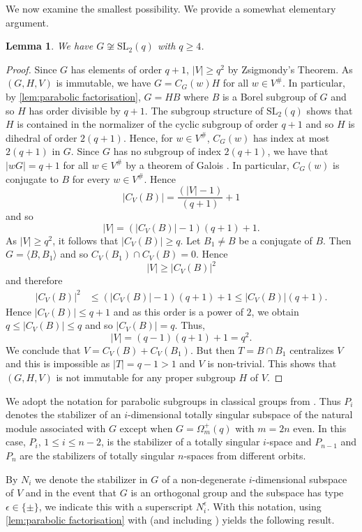 \documentclass[12pt]{amsart}
\newtheorem{lemma}[theorem]{Lemma}
\theoremstyle{remark}
\theoremstyle{notation}
\theoremstyle{definition}
\newcommand{\SL}{\mathrm{SL}}
\newcommand{\0}{\emptyset}
\begin{document}
We now examine the smallest possibility. We provide a somewhat elementary argument.

\begin{lemma}\label{lem:no factSL2}
We have  $G \not\cong \SL_2(q)$ with $q\ge 4$. \end{lemma}

\begin{proof}  Since $G$ has elements of order $q+1$, $|V| \ge q^2$ by Zsigmondy's Theorem.
 As $(G,H,V)$ is immutable, we have $G= C_G(w)H$ for all $w \in V^\#$.  In particular, by \cref{lem:parabolic factorisation}, $G=HB$ where $B$ is a Borel subgroup of $G$ and so $H$  has order divisible by $q+1$. The subgroup structure \cite[Satz II.8.27]{Huppert} of $\SL_2(q)$ shows that $H$ is contained in the normalizer of the cyclic subgroup of order $q+1$ and so $H$ is  dihedral of order $2(q+1)$. Hence, for $w\in V^\#$, $C_G(w)$ has index  at most $2(q+1)$ in $G$.    Since $G$ has no subgroup of index $2(q+1)$, we have that $|w G|=q+1$ for all $w \in V^\#$ by a theorem of Galois \cite[Satz II.8.28]{Huppert}. In particular,   $C_G(w)$ is conjugate to $B$ for every $w \in V^\#$. Hence $$|C_V(B)|= \frac{(|V|-1)}{(q+1)} +1$$ and so $$|V|= (|C_V(B)|-1)(q+1)+1.$$ As $|V|\ge q^2$, it follows that $|C_V(B)|\ge q$.
Let $B_1\ne B$ be a conjugate of $B$.
Then $G=\langle B,B_1\rangle $ and so
$C_V(B_1) \cap C_V(B)=0$. Hence $$|V|\ge |C_V(B)|^2$$
and therefore \begin{eqnarray*}
|C_V(B)|^2&\le (|C_V(B)|-1)(q+1)+1\le |C_V(B)|(q+1).
\end{eqnarray*}
Hence $|C_V(B)|\le q+1$ and as this order is a power of $2$,  we obtain $q\le |C_V(B)|\le q$ and so $|C_V(B)|=q$.  Thus, $$|V| = (q-1)(q+1)+1=q^2.$$    We conclude that $V= C_V(B)+C_V(B_1)$.  But then $T=B\cap B_1$ centralizes $V$ and this is impossible as $|T|=q-1>1$ and $V$ is non-trivial. This shows that $(G,H,V)$ is not immutable for any proper subgroup $H$ of $V$.
\end{proof}


We adopt the  notation for parabolic subgroups  in classical groups from \cite[Page 5]{LiebeckPraegerSaxl}. Thus $P_i$ denotes the stabilizer of an $i$-dimensional totally singular subspace of the natural module associated with $G$ except when $G=\Omega_{m}^+(q)$ with $m=2n$ even. In this case, $P_i$, $1\le i\le n-2$, is the stabilizer of a totally singular $i$-space and $P_{n-1}$ and $P_n$ are the stabilizers of totally  singular $n$-spaces from different orbits.


 By $N_i$ we denote the stabilizer in $G$ of a non-degenerate $i$-dimensional subspace of $V$ and in the event that $G$ is an orthogonal group and the subspace has type $\epsilon\in \{\pm\}$, we indicate this with a superscript $N_i^\epsilon$. With this notation, using \cref{lem:parabolic factorisation} with \cite[Theorem A, Tables 1, 2 3\& 4]{LiebeckPraegerSaxl} (and including \cite[Table 2]{GGS}) yields the following result.
\end{document}
